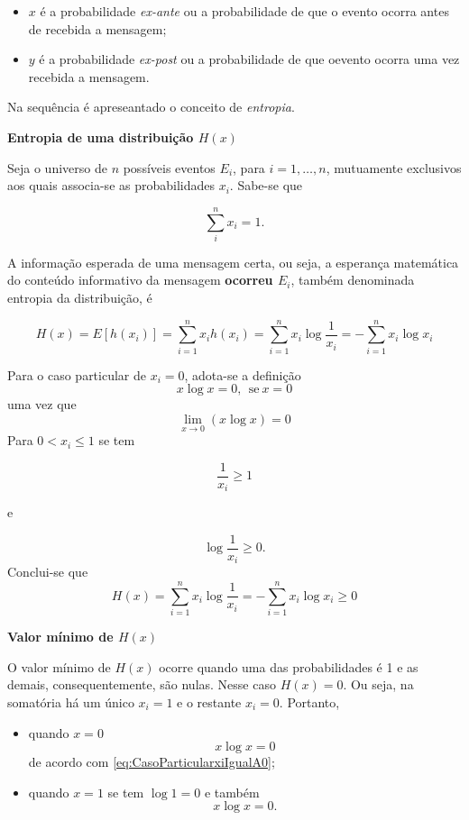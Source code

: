\documentclass[
]{book}
\begin{document}
\begin{itemize}
\item
  \(x\) é a probabilidade \emph{ex-ante} ou a probabilidade de que o evento ocorra antes de recebida a mensagem;
\item
  \(y\) é a probabilidade \emph{ex-post} ou a probabilidade de que oevento ocorra uma vez recebida a mensagem.
\end{itemize}

Na sequência é apreseantado o conceito de \emph{entropia}.

\textbf{Entropia de uma distribuição \(H(x)\)}

Seja o universo de \(n\) possíveis eventos \(E_i\), para \(i=1,\ldots ,n\), mutuamente exclusivos aos quais associa-se as probabilidades \(x_i\). Sabe-se que

\[
  \sum_{i}^{n} x_i = 1.
\]

A informação esperada de uma mensagem certa, ou seja, a esperança matemática do conteúdo informativo da mensagem \textbf{ocorreu \(E_i\)}, também denominada entropia da distribuição, é

\[
  H(x) = E[h(x_i)] = \sum_{i=1}^{n} x_i h(x_i) = \sum_{i=1}^{n}x_i \log\dfrac{1}{x_i} = - \sum_{i=1}^{n}x_i \log x_i
  \label{eq:InformacaoEsperadaDeUmaMensagemCerta}
\]

Para o caso particular de \(x_i= 0\), adota-se a definição
\[
 x\log x = 0,~~\text{se}~x = 0
 \label{eq:CasoParticularxiIgualA0}
\]
uma vez que
\[
  \lim_{x\rightarrow 0}(x\log x) = 0
\]
Para \(0 < x_i \leq 1\) se tem

\[
\dfrac{1}{x_i}\geq 1
\]

e

\[
\log \dfrac{1}{x_i} \geq 0.
\]
Conclui-se que
\[
H(x) = \sum_{i=1}^{n} x_i \log \dfrac{1}{x_i} = - \sum_{i=1}^{n} x_i \log x_i \geq 0 
\]

\textbf{Valor mínimo de \(H(x)\)}

O valor mínimo de \(H(x)\) ocorre quando uma das probabilidades é 1 e as demais, consequentemente, são nulas. Nesse caso \(H(x) = 0\). Ou seja, na somatória há um único \(x_i=1\) e o restante \(x_i = 0\). Portanto,

\begin{itemize}
\item
  quando \(x=0\)
  \[
    x \log x = 0
  \]
  de acordo com \eqref{eq:CasoParticularxiIgualA0};
\item
  quando \(x=1\) se tem \(\log 1 = 0\) e também
  \[
    x \log x = 0.
  \]
\end{itemize}
\end{document}
